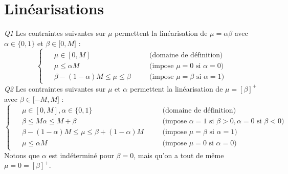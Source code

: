 \documentclass[a4paper,12pt]{article}
\begin{document}
\section{Linéarisations}
    \textit{Q1 }
    Les contraintes suivantes sur $\mu$ permettent la linéarisation de $\mu = \alpha \beta$ avec $\alpha \in \lbrace 0,1 \rbrace$ et $\beta \in \lbrack 0, M \rbrack$ : 
    \begin{equation*}
        \begin{cases}
            \begin{alignedat}{2}
                &\mu \in [0,M] && \quad \text{(domaine de définition)}  \\ 
                &\mu \leq \alpha M && \quad  \text{(impose } \mu = 0 \text{ si }  \alpha = 0 \text{)}\\
                &\beta - (1 - \alpha)M \leq \mu \leq \beta && \quad \text{(impose } \mu = \beta \text{ si }  \alpha = 1 \text{)}
            \end{alignedat}
        \end{cases}
    \end{equation*}
    \textit{Q2 }
    Les contraintes suivantes sur $\mu$ et $\alpha$ permettent la linéarisation de $\mu = [\beta]^{+}$ avec $\beta \in \lbrack -M, M \rbrack$ : 
    \begin{equation*}
        \begin{cases}
            \begin{alignedat}{2}
                &\mu \in [0,M], \alpha \in \lbrace 0,1 \rbrace && \quad \text{(domaine de définition)} \\ 
                &\beta \leq M \alpha \leq M + \beta && \quad \text{(impose } \alpha = 1 \text{ si }  \beta > 0, \alpha = 0 \text{ si } \beta < 0 \text{)} \\
                &\beta - (1-\alpha)M \leq \mu \leq \beta + (1-\alpha)M && \quad \text{(impose } \mu = \beta \text{ si }  \alpha = 1 \text{)} \\
                &\mu \leq \alpha M && \quad \text{(impose } \mu = 0 \text{ si }  \alpha = 0 \text{)}
            \end{alignedat}
        \end{cases}
    \end{equation*}
    Notons que $\alpha$ est indéterminé pour $\beta = 0$, mais qu'on a tout de même $\mu = 0= [\beta]^{+}$.
\end{document}
